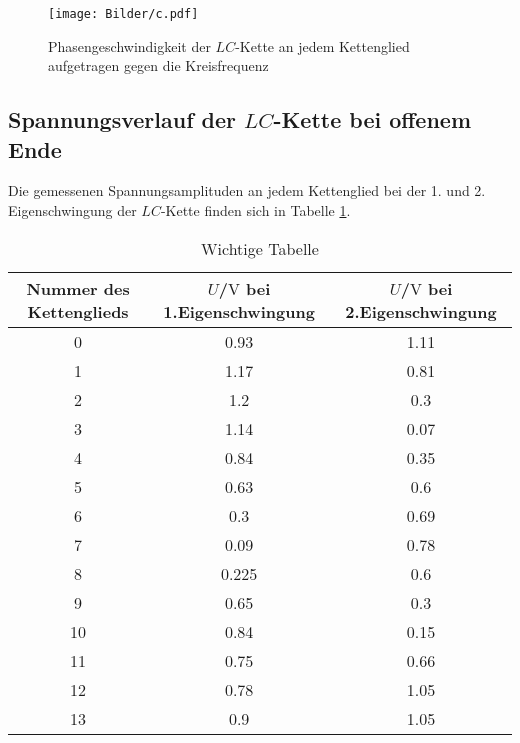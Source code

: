 \begin{figure}
  \centering
 \texttt{[image: Bilder/c.pdf]}
  \caption{Phasengeschwindigkeit der $LC$-Kette an jedem Kettenglied aufgetragen gegen die Kreisfrequenz}
  \label{fig:plotc}
\end{figure}
\subsection{Spannungsverlauf der $LC$-Kette bei offenem Ende}
Die gemessenen Spannungsamplituden an jedem Kettenglied bei der 1. und 2. Eigenschwingung der $LC$-Kette finden sich in Tabelle \ref{tab:ei}.

\begin{table}
   \centering
\caption{Wichtige Tabelle}
\label{tab:ei}
\begin{tabular}{ccc}
  \toprule
Nummer des Kettenglieds & $U$/$\si{\volt}$ bei 1.Eigenschwingung & $U$/$\si{\volt}$ bei 2.Eigenschwingung \\
\midrule
0 & 0.93 & 1.11 \\
1 & 1.17 & 0.81 \\
2 & 1.2 & 0.3 \\
3 & 1.14 & 0.07 \\
4 & 0.84 & 0.35 \\
5 & 0.63 & 0.6 \\
6 & 0.3 & 0.69 \\
7 & 0.09 & 0.78 \\
8 & 0.225 & 0.6 \\
9 & 0.65 & 0.3 \\
10 & 0.84 & 0.15 \\
11 & 0.75 & 0.66 \\
12 & 0.78 & 1.05 \\
13 & 0.9 & 1.05 \\
\bottomrule
\end{tabular}
\end{table}

